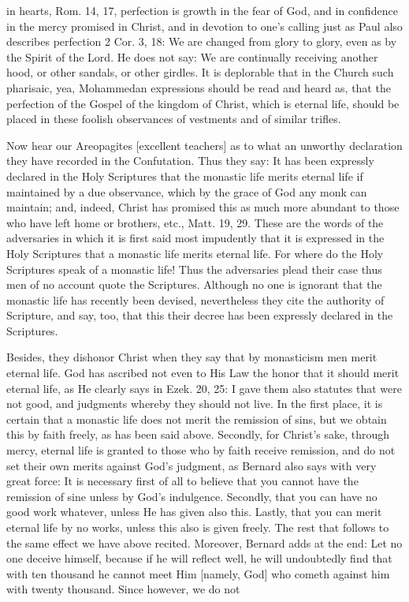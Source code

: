 in hearts, Rom. 14, 17, perfection is growth in the fear of God, and
in confidence in the mercy promised in Christ, and in devotion to
one's calling just as Paul also describes perfection 2 Cor. 3, 18: We
are changed from glory to glory, even as by the Spirit of the Lord.
He does not say: We are continually receiving another hood, or other
sandals, or other girdles.  It is deplorable that in the Church such
pharisaic, yea, Mohammedan expressions should be read and heard as,
that the perfection of the Gospel of the kingdom of Christ, which is
eternal life, should be placed in these foolish observances of
vestments and of similar trifles.

Now hear our Areopagites [excellent teachers] as to what an unworthy
declaration they have recorded in the Confutation.  Thus they say: It
has been expressly declared in the Holy Scriptures that the monastic
life merits eternal life if maintained by a due observance, which by
the grace of God any monk can maintain; and, indeed, Christ has
promised this as much more abundant to those who have left home or
brothers, etc., Matt. 19, 29. These are the words of the adversaries
in which it is first said most impudently that it is expressed in the
Holy Scriptures that a monastic life merits eternal life.  For where
do the Holy Scriptures speak of a monastic life!  Thus the
adversaries plead their case thus men of no account quote the
Scriptures.  Although no one is ignorant that the monastic life has
recently been devised, nevertheless they cite the authority of
Scripture, and say, too, that this their decree has been expressly
declared in the Scriptures.

Besides, they dishonor Christ when they say that by monasticism men
merit eternal life.  God has ascribed not even to His Law the honor
that it should merit eternal life, as He clearly says in Ezek. 20, 25:
I gave them also statutes that were not good, and judgments whereby
they should not live.  In the first place, it is certain that a
monastic life does not merit the remission of sins, but we obtain
this by faith freely, as has been said above.  Secondly, for Christ's
sake, through mercy, eternal life is granted to those who by faith
receive remission, and do not set their own merits against God's
judgment, as Bernard also says with very great force: It is necessary
first of all to believe that you cannot have the remission of sine
unless by God's indulgence.  Secondly, that you can have no good work
whatever, unless He has given also this.  Lastly, that you can merit
eternal life by no works, unless this also is given freely.  The rest
that follows to the same effect we have above recited.  Moreover,
Bernard adds at the end: Let no one deceive himself, because if he
will reflect well, he will undoubtedly find that with ten thousand he
cannot meet Him [namely, God] who cometh against him with twenty
thousand.  Since however, we do not

